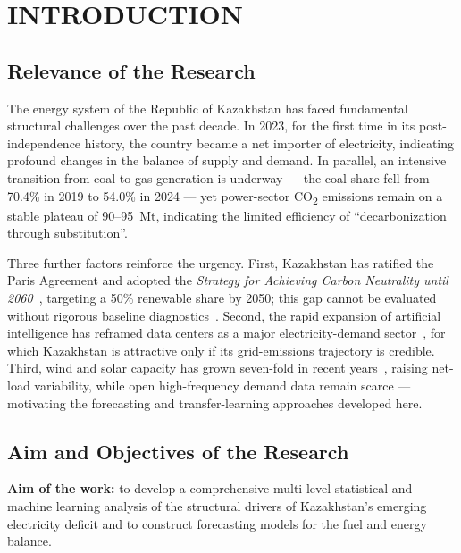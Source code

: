 
\chapter{INTRODUCTION}
\label{ch:introduction}

\section{Relevance of the Research}
\label{sec:relevance}

The energy system of the Republic of Kazakhstan has faced fundamental structural challenges over the past decade. In 2023, for the first time in its post-independence history, the country became a net importer of electricity, indicating profound changes in the balance of supply and demand. In parallel, an intensive transition from coal to gas generation is underway --- the coal share fell from 70.4\% in 2019 to 54.0\% in 2024 --- yet power-sector CO\textsubscript{2} emissions remain on a stable plateau of 90--95~Mt, indicating the limited efficiency of ``decarbonization through substitution''.

Three further factors reinforce the urgency. First, Kazakhstan has ratified the Paris Agreement and adopted the \textit{Strategy for Achieving Carbon Neutrality until 2060}~\cite{moe2023strategy}, targeting a 50\% renewable share by 2050; this gap cannot be evaluated without rigorous baseline diagnostics~\cite{rogelj2018, ipcc2022}. Second, the rapid expansion of artificial intelligence has reframed data centers as a major electricity-demand sector~\cite{masanet2020, iea2024dc, shehabi2024}, for which Kazakhstan is attractive only if its grid-emissions trajectory is credible. Third, wind and solar capacity has grown seven-fold in recent years~\cite{ember2024, irena2024}, raising net-load variability, while open high-frequency demand data remain scarce --- motivating the forecasting and transfer-learning approaches developed here.

\section{Aim and Objectives of the Research}
\label{sec:goals}

\textbf{Aim of the work:} to develop a comprehensive multi-level statistical and machine learning analysis of the structural drivers of Kazakhstan's emerging electricity deficit and to construct forecasting models for the fuel and energy balance.

